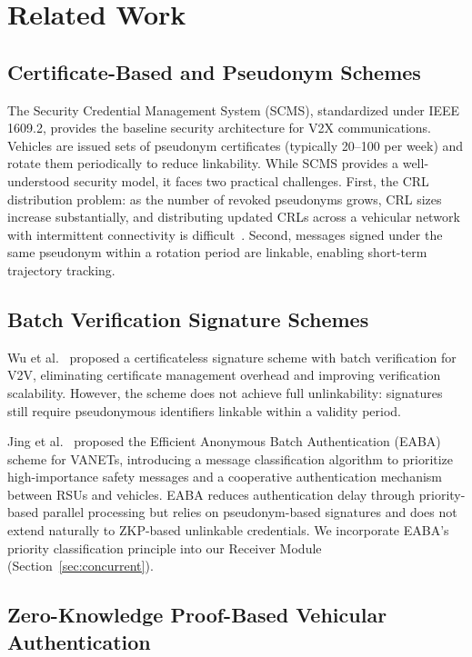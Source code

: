 \section{Related Work}

\subsection{Certificate-Based and Pseudonym Schemes}

The Security Credential Management System (SCMS), standardized under IEEE 1609.2,
provides the baseline security architecture for V2X communications. Vehicles are
issued sets of pseudonym certificates (typically 20--100 per week) and rotate them
periodically to reduce linkability. While SCMS provides a well-understood security
model, it faces two practical challenges. First, the CRL distribution problem: as
the number of revoked pseudonyms grows, CRL sizes increase substantially, and
distributing updated CRLs across a vehicular network with intermittent connectivity
is difficult~\cite{scopelliti2024}. Second, messages signed under the same pseudonym
within a rotation period are linkable, enabling short-term trajectory tracking.

\subsection{Batch Verification Signature Schemes}

Wu et al.~\cite{zhang2024} proposed a certificateless signature scheme with
batch verification for V2V, eliminating certificate management overhead and improving
verification scalability. However, the scheme does not achieve full unlinkability:
signatures still require pseudonymous identifiers linkable within a validity period.

Jing et al.~\cite{zheng2018eaba} proposed the Efficient Anonymous Batch
Authentication (EABA) scheme for VANETs, introducing a message classification
algorithm to prioritize high-importance safety messages and a cooperative
authentication mechanism between RSUs and vehicles. EABA reduces authentication
delay through priority-based parallel processing but relies on pseudonym-based
signatures and does not extend naturally to ZKP-based unlinkable credentials. We
incorporate EABA's priority classification principle into our Receiver Module
(Section~\ref{sec:concurrent}).

\subsection{Zero-Knowledge Proof-Based Vehicular Authentication}

